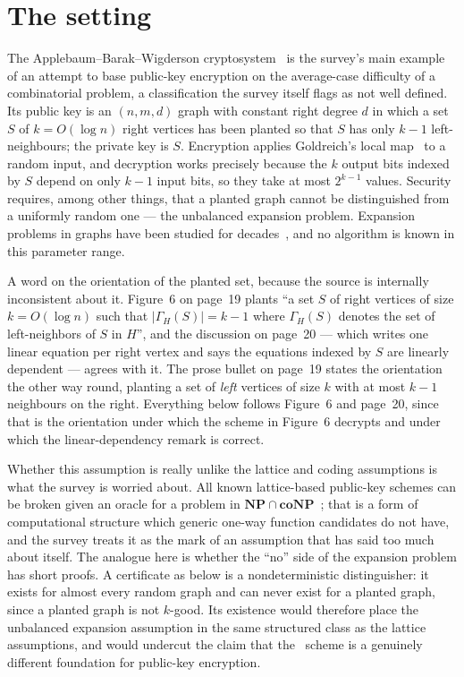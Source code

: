 \documentclass{conjura-conjecture}
\newcommand{\NP}{\mathbf{NP}}
\newcommand{\coNP}{\mathbf{coNP}}
\begin{document}
\section{The setting}\label{sec:setting}

The Applebaum--Barak--Wigderson cryptosystem~\cite{ABW10} is the
survey's main example of an attempt to base public-key encryption on
the average-case difficulty of a combinatorial problem, a
classification the survey itself flags as not well defined. Its public
key is an $(n,m,d)$ graph with constant right degree $d$ in which a set
$S$ of $k = O(\log n)$ right vertices has been planted so that $S$ has
only $k-1$ left-neighbours; the private key is $S$. Encryption applies
Goldreich's local map~\cite{Gol11,App15} to a random input, and
decryption works precisely because the $k$ output bits indexed by $S$
depend on only $k-1$ input bits, so they take at most $2^{k-1}$ values.
Security requires, among other things, that a planted graph cannot be
distinguished from a uniformly random one --- the unbalanced expansion
problem. Expansion problems in graphs have been studied for
decades~\cite{HLW06}, and no algorithm is known in this parameter
range.

A word on the orientation of the planted set, because the source is
internally inconsistent about it. Figure~6 on page~19 plants ``a set
$S$ of right vertices of size $k = O(\log n)$ such that
$|\Gamma_H(S)| = k-1$ where $\Gamma_H(S)$ denotes the set of
left-neighbors of $S$ in $H$'', and the discussion on page~20 --- which
writes one linear equation per right vertex and says the equations
indexed by $S$ are linearly dependent --- agrees with it. The prose
bullet on page~19 states the orientation the other way round, planting
a set of \emph{left} vertices of size $k$ with at most $k-1$ neighbours
on the right. Everything below follows Figure~6 and page~20, since that
is the orientation under which the scheme in Figure~6 decrypts and
under which the linear-dependency remark is correct.

Whether this assumption is really unlike the lattice and coding
assumptions is what the survey is worried about. All known
lattice-based public-key schemes can be broken given an oracle for a
problem in $\NP \cap \coNP$~\cite{AR05}; that is a form of
computational structure which generic one-way function candidates do
not have, and the survey treats it as the mark of an assumption that
has said too much about itself. The analogue here is whether the
``no'' side of the expansion problem has short proofs. A certificate as
below is a nondeterministic distinguisher: it exists for almost every
random graph and can never exist for a planted graph, since a planted
graph is not $k$-good. Its existence would therefore place the
unbalanced expansion assumption in the same structured class as the
lattice assumptions, and would undercut the claim that
the~\cite{ABW10} scheme is a genuinely different foundation for
public-key encryption.
\end{document}
